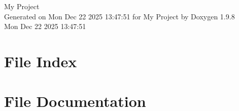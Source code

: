 \documentclass[twoside]{book}
\newcommand{\+}{\discretionary{\mbox{\scriptsize$\hookleftarrow$}}{}{}}
\newcommand{\clearemptydoublepage}{%
    \newpage{\pagestyle{empty}\cleardoublepage}%
  }
\begin{document}
  \raggedbottom
    \hypersetup{pageanchor=false,
                bookmarksnumbered=true,
                pdfencoding=unicode
               }
  \begin{titlepage}
  \vspace*{7cm}
  \begin{center}%
  {\Large My Project}\\
  \vspace*{1cm}
  {\large Generated on Mon Dec 22 2025 13\+:47\+:51 for My Project by Doxygen 1.9.8}\\
    \vspace*{0.5cm}
    {\small Mon Dec 22 2025 13:47:51}
  \end{center}
  \end{titlepage}
  \clearemptydoublepage
  \tableofcontents
  \clearemptydoublepage
  \hypersetup{pageanchor=true}

\chapter{File Index}

\chapter{File Documentation}


  \backmatter
  \newpage
  \clearemptydoublepage
  \printindex
\end{document}
